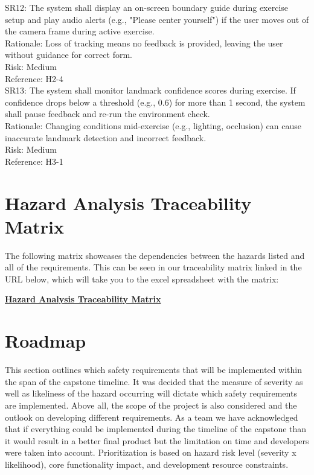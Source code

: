 \documentclass{article}
\begin{document}
\noindent
SR12: The system shall display an on-screen boundary guide during exercise setup and play audio alerts (e.g., "Please center yourself") if the user moves out of the camera frame during active exercise.\\
Rationale: Loss of tracking means no feedback is provided, leaving the user without guidance for correct form.\\
Risk: Medium\\
Reference: H2-4\\

\noindent
SR13: The system shall monitor landmark confidence scores during exercise. If confidence drops below a threshold (e.g., 0.6) for more than 1 second, the system shall pause feedback and re-run the environment check.\\
Rationale: Changing conditions mid-exercise (e.g., lighting, occlusion) can cause inaccurate landmark detection and incorrect feedback.\\
Risk: Medium\\
Reference: H3-1\\

\section{Hazard Analysis Traceability Matrix}
The following matrix showcases the dependencies between the hazards listed and all of the requirements. This can be seen in our traceability matrix
linked in the URL below, which will take you to the excel spreadsheet with the matrix:

\href{https://docs.google.com/spreadsheets/d/1BZr2OcK3T8PGUiMeMU3S7zty0K8VHZ0V/edit?usp=sharing&ouid=112015094717290091700&rtpof=true&sd=true}{\textbf{Hazard Analysis Traceability Matrix}}



\section{Roadmap}

This section outlines which safety requirements that will be implemented within the span of the capstone timeline. It was decided that the measure of severity as well as likeliness of the hazard occurring will dictate which safety requirements are implemented. Above all, the scope of the project is also considered and the outlook on developing different requirements. As a team we have acknowledged that if everything could be implemented during the timeline of the capstone than it would result in a better final product but the limitation on time and developers were taken into account. Prioritization is based on hazard risk level (severity x likelihood), core functionality impact, and development resource constraints.
\end{document}
